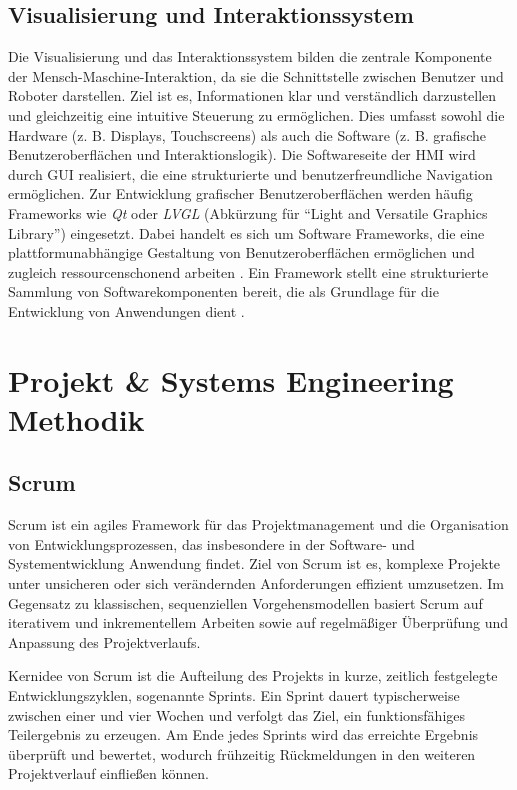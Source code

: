 \subsection{Visualisierung und Interaktionssystem}
\label{cha:Visualisierung und Interaktionssystem}

Die Visualisierung und das Interaktionssystem bilden die zentrale Komponente der Mensch-Maschine-Interaktion, da sie die Schnittstelle zwischen Benutzer und Roboter darstellen. Ziel ist es, Informationen klar und verständlich darzustellen und gleichzeitig eine intuitive Steuerung zu ermöglichen. Dies umfasst sowohl die Hardware (z. B. Displays, Touchscreens) als auch die Software (z. B. grafische Benutzeroberflächen und Interaktionslogik). Die Softwareseite der HMI wird durch GUI realisiert, die eine strukturierte und benutzerfreundliche Navigation ermöglichen. Zur Entwicklung grafischer Benutzeroberflächen werden häufig Frameworks wie \emph{Qt} oder \emph{LVGL} (Abkürzung für \enquote{Light and Versatile Graphics Library}) eingesetzt. Dabei handelt es sich um Software Frameworks, die eine plattformunabhängige Gestaltung von Benutzeroberflächen ermöglichen und zugleich ressourcenschonend arbeiten \autocite{Qt.2024} \autocite{LVGL.2024}. Ein Framework stellt eine strukturierte Sammlung von Softwarekomponenten bereit, die als Grundlage für die Entwicklung von Anwendungen dient \autocite{AWS.2026}.

\section{Projekt \& Systems Engineering Methodik}
\label{cha:Projekt und Systems Engineering Methodik}

\subsection{Scrum}
\label{cha:Scrum}

Scrum ist ein agiles Framework für das Projektmanagement und die Organisation von Entwicklungsprozessen, das insbesondere in der Software- und Systementwicklung Anwendung findet. Ziel von Scrum ist es, komplexe Projekte unter unsicheren oder sich verändernden Anforderungen effizient umzusetzen. Im Gegensatz zu klassischen, sequenziellen Vorgehensmodellen basiert Scrum auf iterativem und inkrementellem Arbeiten sowie auf regelmäßiger Überprüfung und Anpassung des Projektverlaufs. \cite{schwaber2020scrumguide}\cite{poppendieck2013leanagile}

Kernidee von Scrum ist die Aufteilung des Projekts in kurze, zeitlich festgelegte Entwicklungszyklen, sogenannte Sprints. Ein Sprint dauert typischerweise zwischen einer und vier Wochen und verfolgt das Ziel, ein funktionsfähiges Teilergebnis zu erzeugen. Am Ende jedes Sprints wird das erreichte Ergebnis überprüft und bewertet, wodurch frühzeitig Rückmeldungen in den weiteren Projektverlauf einfließen können.
\cite{schwaber2020scrumguide}

